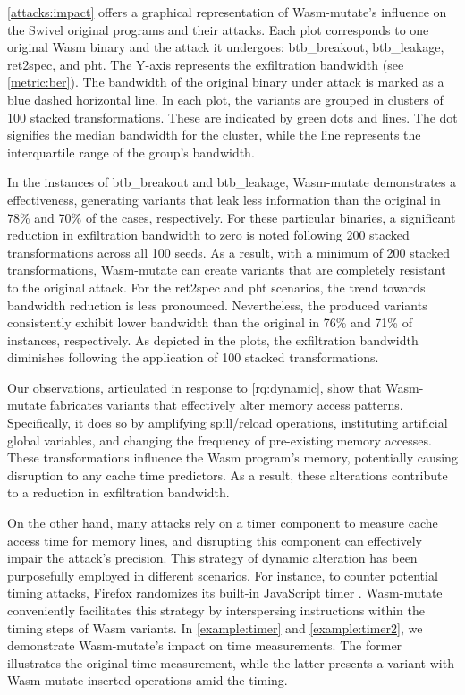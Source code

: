\documentclass[sigplan,screen]{acmart}
\newcommand{\tool}{Wasm-mutate\xspace}
\newcommand{\wasm}{Wasm\xspace}
\begin{document}
\autoref{attacks:impact} offers a graphical representation of \tool's influence on the Swivel original programs and their attacks. 
Each plot corresponds to one original \wasm binary and the attack it undergoes: btb\_breakout, btb\_leakage, ret2spec, and pht.
The Y-axis represents the exfiltration bandwidth (see \autoref{metric:ber}). 
The bandwidth of the original binary under attack is marked as a blue  dashed horizontal line.
In each plot, the variants are grouped in clusters of 100 stacked transformations. 
These are indicated by green dots and lines. 
The dot signifies the median bandwidth for the cluster, while the line represents the interquartile range of the group's bandwidth.



In the instances of btb\_breakout and btb\_leakage, \tool demonstrates a effectiveness, generating variants that leak less information than the original in 78\% and 70\% of the cases, respectively.
For these particular binaries, a significant reduction in exfiltration bandwidth to zero is noted following 200 stacked transformations across all 100 seeds.
As a result, with a minimum of 200 stacked transformations, \tool can create variants that are completely resistant to the original attack.
For the ret2spec and pht scenarios, the trend towards bandwidth reduction is less pronounced.
Nevertheless, the produced variants consistently exhibit lower bandwidth than the original in 76\% and 71\% of instances, respectively.
As depicted in the plots, the exfiltration bandwidth diminishes following the application of 100 stacked transformations.

Our observations, articulated in response to \ref{rq:dynamic}, show that \tool fabricates variants that effectively alter memory access patterns. 
Specifically, it does so by amplifying spill/reload operations, instituting artificial global variables, and changing the frequency of pre-existing memory accesses. 
These transformations influence the \wasm program's memory, potentially causing disruption to any cache time predictors. 
As a result, these alterations contribute to a reduction in exfiltration bandwidth.

On the other hand, many attacks rely on a timer component to measure cache access time for memory lines, and disrupting this component can effectively impair the attack's precision. 
This strategy of dynamic alteration has been purposefully employed in different scenarios. 
For instance, to counter potential timing attacks, Firefox randomizes its built-in JavaScript timer \cite{10.1007/978-3-319-70972-7_13}. \tool conveniently facilitates this strategy by interspersing instructions within the timing steps of \wasm variants. 
In \autoref{example:timer} and \autoref{example:timer2}, we demonstrate \tool's impact on time measurements. 
The former illustrates the original time measurement, while the latter presents a variant with \tool-inserted operations amid the timing.
\end{document}
